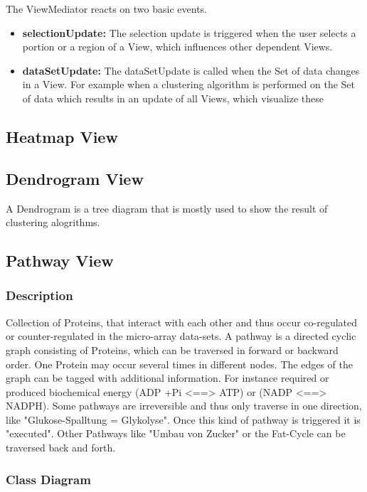 The ViewMediator reacts on two basic events.
\begin{itemize}
\item \textbf{selectionUpdate: } The selection update is triggered when the user selects a portion or a region of a View, which influences other dependent Views.
\item \textbf{dataSetUpdate: } The dataSetUpdate is called when the Set of data changes in a View. For example when a clustering algorithm is performed on the Set of data which results in an update of all Views, which visualize these 
\end{itemize}

\subsection{Heatmap View}

\subsection{Dendrogram View}

A Dendrogram is a tree diagram that is mostly used to show the result of clustering alogrithms.

\subsection{Pathway View}

\subsubsection{Description}
\label{sssec:pathway_description}

Collection of Proteins, that interact with each other and thus occur co-regulated or counter-regulated in the micro-array data-sets. A pathway is a directed cyclic graph consisting of Proteins, which can be traversed in forward or backward order. One Protein may occur several times in different nodes. The edges of the graph can be tagged with additional information. For instance required or produced biochemical energy (ADP +Pi  <==> ATP) or (NADP <==> NADPH). Some pathways are irreversible and thus only traverse in one direction, like "Glukose-Spalltung = Glykolyse". Once this kind of pathway is triggered it is "executed". Other Pathways like "Umbau von Zucker" or the Fat-Cycle can be traversed back and forth.

\subsubsection{Class Diagram}

